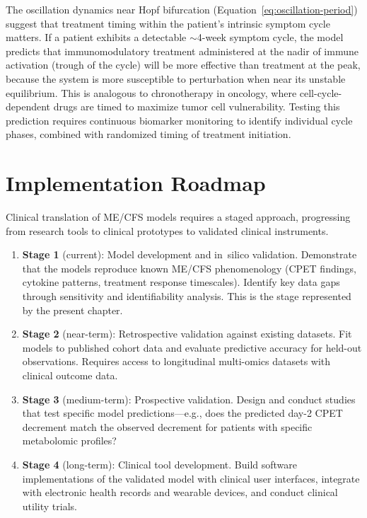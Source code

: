 \begin{speculation}
The oscillation dynamics near Hopf bifurcation (Equation~\ref{eq:oscillation-period}) suggest that treatment timing within the patient's intrinsic symptom cycle matters. If a patient exhibits a detectable $\sim$4-week symptom cycle, the model predicts that immunomodulatory treatment administered at the nadir of immune activation (trough of the cycle) will be more effective than treatment at the peak, because the system is more susceptible to perturbation when near its unstable equilibrium. This is analogous to chronotherapy in oncology, where cell-cycle-dependent drugs are timed to maximize tumor cell vulnerability. Testing this prediction requires continuous biomarker monitoring to identify individual cycle phases, combined with randomized timing of treatment initiation.
\end{speculation}

\section{Implementation Roadmap}
\label{sec:implementation-roadmap}

Clinical translation of ME/CFS models requires a staged approach, progressing from research tools to clinical prototypes to validated clinical instruments.

\begin{enumerate}
    \item \textbf{Stage 1} (current): Model development and in~silico validation. Demonstrate that the models reproduce known ME/CFS phenomenology (CPET findings, cytokine patterns, treatment response timescales). Identify key data gaps through sensitivity and identifiability analysis. This is the stage represented by the present chapter.
    \item \textbf{Stage 2} (near-term): Retrospective validation against existing datasets. Fit models to published cohort data and evaluate predictive accuracy for held-out observations. Requires access to longitudinal multi-omics datasets with clinical outcome data.
    \item \textbf{Stage 3} (medium-term): Prospective validation. Design and conduct studies that test specific model predictions---e.g., does the predicted day-2 CPET decrement match the observed decrement for patients with specific metabolomic profiles?
    \item \textbf{Stage 4} (long-term): Clinical tool development. Build software implementations of the validated model with clinical user interfaces, integrate with electronic health records and wearable devices, and conduct clinical utility trials.
\end{enumerate}

